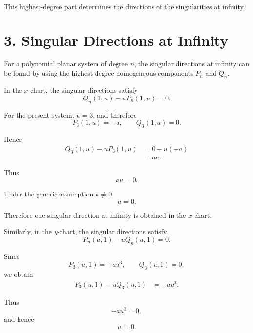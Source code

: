 \documentclass[11pt,a4paper]{article}
\begin{document}
This highest-degree part determines the directions of the
singularities at infinity.

\section{3. Singular Directions at Infinity}

For a polynomial planar system of degree $n$, the singular
directions at infinity can be found by using the highest-degree
homogeneous components $P_n$ and $Q_n$.

In the $x$-chart, the singular directions satisfy
\begin{equation}
\boxed{
Q_n(1,u)-uP_n(1,u)=0.
}
\tag{6}
\end{equation}

For the present system, $n=3$, and therefore
\begin{equation}
P_3(1,u)=-a,
\qquad
Q_3(1,u)=0.
\end{equation}

Hence
\begin{align}
Q_3(1,u)-uP_3(1,u)
&=
0-u(-a)\\
&=au.
\end{align}

Thus
\begin{equation}
au=0.
\end{equation}

Under the generic assumption $a\neq0$,
\begin{equation}
\boxed{
u=0.
}
\tag{7}
\end{equation}

Therefore one singular direction at infinity is obtained in the
$x$-chart.

Similarly, in the $y$-chart, the singular directions satisfy
\begin{equation}
\boxed{
P_n(u,1)-uQ_n(u,1)=0.
}
\tag{8}
\end{equation}

Since
\begin{equation}
P_3(u,1)=-au^3,
\qquad
Q_3(u,1)=0,
\end{equation}
we obtain
\begin{align}
P_3(u,1)-uQ_3(u,1)
&=
-au^3.
\end{align}

Thus
\begin{equation}
-au^3=0,
\end{equation}
and hence
\begin{equation}
\boxed{
u=0.
}
\tag{9}
\end{equation}
\end{document}
